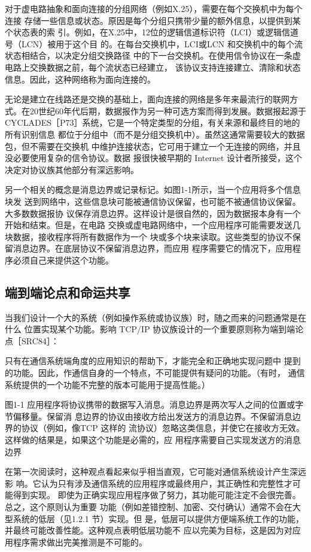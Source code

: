 对于虚电路抽象和面向连接的分组网络（例如X.25），需要在每个交换机中为每个连接
存储一些信息或状态。原因是每个分组只携带少量的额外信息，以提供到某个状态表的索
引。例如，在X.25中，12位的逻辑信道标识符（LCI）或逻辑信道号（LCN）被用于这个目
的。在每台交换机中，LCI或LCN 和交换机中的每个流状态相结合，以决定分组交换路径
中的下一台交换机。在使用信令协议在一条虚电路上交换数据之前，每个流状态已经建立，
该协议支持连接建立、清除和状态信息。因此，这种网络称为面向连接的。

无论是建立在线路还是交换的基础上，面向连接的网络是多年来最流行的联网方
式。在20世纪60年代后期，数据报作为另一种可选方案而得到发展。数据报起源于
CYCLADES［P73］系统，它是一个特定类型的分组，有关来源和最终目的地的所有识别信息
都位于分组中（而不是分组交换机中）。虽然这通常需要较大的数据包，但不需要在交换机
中维护连接状态，它可用于建立一个无连接的网络，并且没必要使用复杂的信令协议。数据
报很快被早期的 Internet 设计者所接受，这个决定对协议族其他部分有深远影响。

另一个相关的概念是消息边界或记录标记。如图1-1所示，当一个应用将多个信息块发
送到网络中，这些信息块可能被通信协议保留，也可能不被通信协议保留。大多数数据报协
议保存消息边界。这样设计是很自然的，因为数据报本身有一个开始和结束。但是，在电路
交换或虚电路网络中，一个应用程序可能需要发送几块数据，接收程序将所有数据作为一个
块或多个块来读取。这些类型的协议不保留消息边界。在底层协议不保留消息边界，而应用
程序需要它的情况下，应用程序必须自己来提供这个功能。

\subsection{端到端论点和命运共享}
当我们设计一个大的系统（例如操作系统或协议族）时，随之而来的问题通常是在什么
位置实现某个功能。影响 TCP/IP 协议族设计的一个重要原则称为端到端论点［SRC84］：

只有在通信系统端角度的应用知识的帮助下，才能完全和正确地实现问题中
提到的功能。因此，作通信自身的一个特点，不可能提供有疑问的功能。（有时，
通信系统提供的一个功能不完整的版本可能用于提高性能。）

图1-1 应用程序将协议携带的数据写入消息。消息边界是两次写人之间的位置或字节偏移量。保留消
息边界的协议由接收方给出发送方的消息边界。不保留消息边界的协议（例如，像TCP 这样的
流协议）忽略这类信息，并使它在接收方无效。这样做的结果是，如果这个功能是必需的，应
用程序需要自己实现发送方的消息边界

在第一次阅读时，这种观点看起来似乎相当直观，它可能对通信系统设计产生深远影
响。它认为只有涉及通信系统的应用程序或最终用户，其正确性和完整性才可能得到实现。
即使为正确实现应用程序做了努力，其功能可能注定不会很完善。总之，这个原则认为重要
功能（例如差错控制、加密、交付确认）通常不会在大型系统的低层（见1.2.1 节）实现。但
是，低层可以提供方便端系统工作的功能，并最终可能改善性能。这种观点表明低层功能不
应以完美为目标，这是因为对应用程序需求做出完美推测是不可能的。


